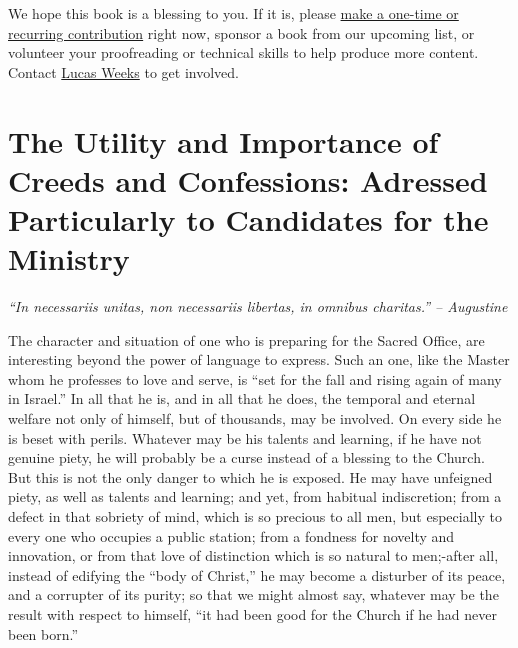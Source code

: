 \documentclass[
]{book}
\begin{document}
We hope this book is a blessing to you. If it is, please \href{https://warhornmedia.com/give}{make a one-time or recurring contribution} right now, sponsor a book from our upcoming list, or volunteer your proofreading or technical skills to help produce more content. Contact \href{mailto:lucas@beggarsborn.com}{Lucas Weeks} to get involved.

\clearpage
\setcounter{page}{1}

\hypertarget{the-utility-and-importance-of-creeds-and-confessions-adressed-particularly-to-candidates-for-the-ministry}{%
\chapter*{The Utility and Importance of Creeds and Confessions: Adressed Particularly to Candidates for the Ministry}\label{the-utility-and-importance-of-creeds-and-confessions-adressed-particularly-to-candidates-for-the-ministry}}

\emph{``In necessariis unitas, non necessariis libertas, in omnibus charitas.'' -- Augustine}

The character and situation of one who is preparing for the Sacred Office, are interesting beyond the power of language to express. Such an one, like the Master whom he professes to love and serve, is ``set for the fall and rising again of many in Israel.'' In all that he is, and in all that he does, the temporal and eternal welfare not only of himself, but of thousands, may be involved. On every side he is beset with perils. Whatever may be his talents and learning, if he have not genuine piety, he will probably be a curse instead of a blessing to the Church. But this is not the only danger to which he is exposed. He may have unfeigned piety, as well as talents and learning; and yet, from habitual indiscretion; from a defect in that sobriety of mind, which is so precious to all men, but especially to every one who occupies a public station; from a fondness for novelty and innovation, or from that love of distinction which is so natural to men;-after all, instead of edifying the ``body of Christ,'' he may become a disturber of its peace, and a corrupter of its purity; so that we might almost say, whatever may be the result with respect to himself, ``it had been good for the Church if he had never been born.''
\end{document}
